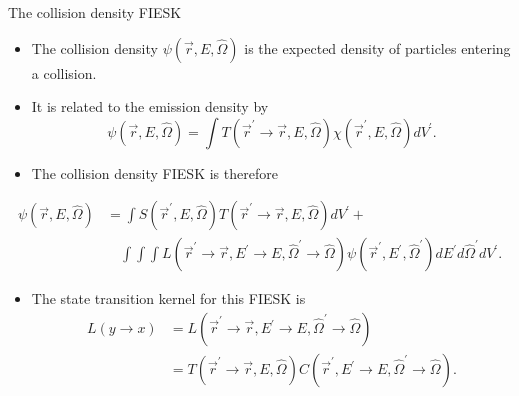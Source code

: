 \documentclass{beamer}
\begin{document}
\begin{frame}{The collision density FIESK}    

  \begin{itemize}
    \item The collision density $\psi(\vec{r},E,\hat{\Omega})$ is the expected 
      density of particles entering a collision.
    \item It is related to the emission density by
      \begin{equation*}
        \psi(\vec{r},E,\hat{\Omega}) = \int 
        T(\vec{r}^{'} \to \vec{r},E,\hat{\Omega})
        \chi(\vec{r}^{'},E,\hat{\Omega})dV^{'}.
      \end{equation*}
    \item The collision density FIESK is therefore
  \end{itemize}
  \begin{align}
    \psi(\vec{r},E,\hat{\Omega}) & = \int S(\vec{r}^{'},E,\hat{\Omega})
    T(\vec{r}^{'} \to \vec{r},E,\hat{\Omega}) dV^{'} + \nonumber \\ 
    & \quad \int\int\int
    L(\vec{r}^{'} \to \vec{r},E^{'} \to E,\hat{\Omega}^{'} \to \hat{\Omega}) 
    \psi(\vec{r}^{'},E^{'},\hat{\Omega}^{'}) dE^{'}d\hat{\Omega}^{'}dV^{'}.
    \nonumber
  \end{align}
  \begin{itemize}
    \item The state transition kernel for this FIESK is
      \begin{align}
        L(y \to x) & = 
        L(\vec{r}^{'} \to \vec{r},E^{'} \to E,\hat{\Omega}^{'} \to \hat{\Omega}) 
        \nonumber \\
        & = T(\vec{r}^{'} \to \vec{r},E,\hat{\Omega})
        C(\vec{r}^{'},E^{'} \to E,\hat{\Omega}^{'} \to \hat{\Omega}). \nonumber
      \end{align}
  \end{itemize}
  
\end{frame}
\end{document}
